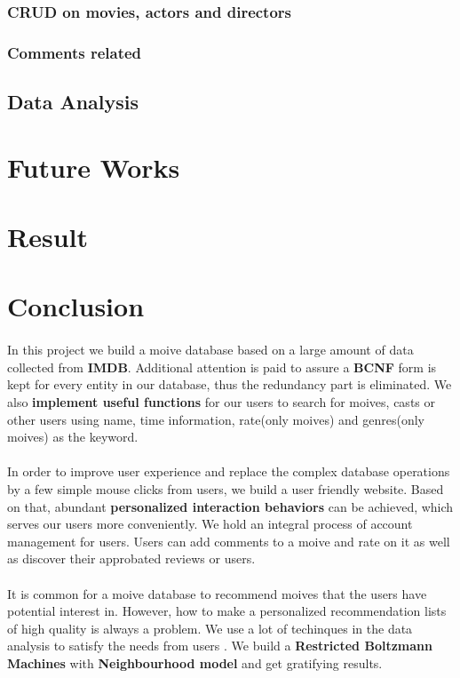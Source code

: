 \begin{CJK*}{UTF8}{gbsn}
\subsubsection{CRUD on movies, actors and directors}
\subsubsection{Comments related}
\subsection{Data Analysis}
\section{Future Works}
\section{Result}

\section{Conclusion}
\paragraph{} In this project we build a moive database based on a large amount of data collected from \textbf{IMDB}. Additional attention is paid to assure a \textbf{BCNF} form is kept for every entity in our database, thus the redundancy part is eliminated. We also \textbf{implement useful functions} for our users to search for moives, casts or other users using name,  time information, rate(only moives) and genres(only moives) as the keyword.
\paragraph{} In order to improve user experience and replace the complex database operations by a few simple mouse clicks from users, we build a user friendly website. Based on that, abundant \textbf{personalized interaction behaviors} can be achieved, which serves our users more conveniently. We hold an integral process of account management for users. Users can add comments to a moive and rate on it as well as discover their approbated reviews or users.
\paragraph{} It is common for a moive database to recommend moives that the users have potential interest in. However,  how to make a personalized recommendation lists of high quality is always a problem. We use a lot of techinques in the data analysis to satisfy the needs from users . We build a \textbf{Restricted Boltzmann Machines}  with \textbf{Neighbourhood model} and get gratifying results.

\end{CJK*}
